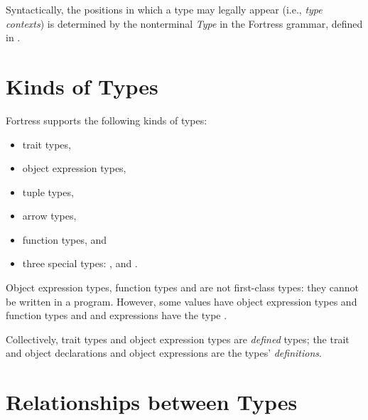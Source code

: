 Syntactically,
the positions in which a type may legally appear (i.e., \emph{type contexts})
is determined by the nonterminal \emph{Type} in the Fortress grammar,
defined in .


\section{Kinds of Types}

Fortress supports the following kinds of types:
\begin{itemize}

\item
trait types,

\item
object expression types,

\item
tuple types,

\item
arrow types,

\item
function types, and

\item
three special types:
,  and \TYP{()}.

\end{itemize}

Object expression types, function types and 
are not first-class types: they cannot be written in a program.
However, some values have object expression types and function types
and  and  expressions have the type .

Collectively,
trait types and object expression types are \emph{defined} types;
the trait and object declarations and object expressions
are the types' \emph{definitions}.


\section{Relationships between Types}

